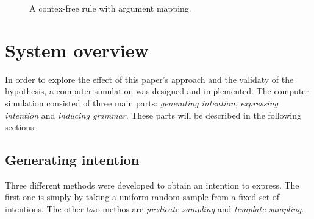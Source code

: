 \documentclass[a4paper]{article}
\begin{document}
\begin{figure}[h!]
\centering
{}
\caption{A contex-free rule with argument mapping.}
\label{fig:rule}
\end{figure}

\section{System overview}
\label{sec:system_overview}
In order to explore the effect of this paper's approach and the validaty of the hypothesis, a computer simulation was designed and implemented. The computer simulation consisted of three main parts: \emph{generating intention}, \emph{expressing intention} and \emph{inducing grammar}. These parts will be described in the following sections.
\subsection{Generating intention}
Three different methods were developed to obtain an intention to express. The first one is simply by taking a uniform random sample from a fixed set of intentions. The other two methos are \emph{predicate sampling} and \emph{template sampling}.
\end{document}
